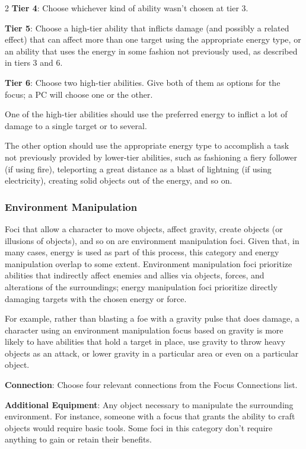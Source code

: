 \begin{multicols}{2}
\textbf{Tier 4}: Choose whichever kind of ability wasn’t chosen at tier 3. 

\textbf{Tier 5}: Choose a high-tier ability that inflicts damage (and possibly a related effect) that can affect more than one target using the appropriate energy type, or an ability that uses the energy in some fashion not previously used, as described in tiers 3 and 6.

\textbf{Tier 6}: Choose two high-tier abilities. Give both of them as options for the focus; a PC will choose one or the other.

One of the high-tier abilities should use the preferred energy to inflict a lot of damage to a single target or to several. 

The other option should use the appropriate energy type to accomplish a task not previously provided by lower-tier abilities, such as fashioning a fiery follower (if using fire), teleporting a great distance as a blast of lightning (if using electricity), creating solid objects out of the energy, and so on.

\subsubsection{Environment Manipulation}

Foci that allow a character to move objects, affect gravity, create objects (or illusions of objects), and so on are environment manipulation foci. Given that, in many cases, energy is used as part of this process, this category and energy manipulation overlap to some extent. Environment manipulation foci prioritize abilities that indirectly affect enemies and allies via objects, forces, and alterations of the surroundings; energy manipulation foci prioritize directly damaging targets with the chosen energy or force.

For example, rather than blasting a foe with a gravity pulse that does damage, a character using an environment manipulation focus based on gravity is more likely to have abilities that hold a target in place, use gravity to throw heavy objects as an attack, or lower gravity in a particular area or even on a particular object.

\textbf{Connection}: Choose four relevant connections from the Focus Connections list. 

\textbf{Additional Equipment}: Any object necessary to manipulate the surrounding environment. For instance, someone with a focus that grants the ability to craft objects would require basic tools. Some foci in this category don’t require anything to gain or retain their benefits.


\end{multicols}
